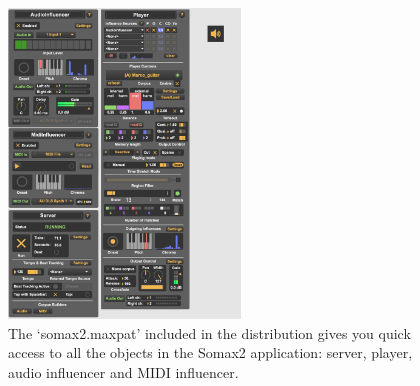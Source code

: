 \begin{figure}[H]
    \centering        
 	\includegraphics[width=0.55\textwidth]{img/somax2.png}
    \caption{The `somax2.maxpat' included in the distribution gives you quick access to all the objects in the Somax2 application: server, player, audio influencer and MIDI influencer.}
    \label{fig:somax2_ui}
\end{figure}

